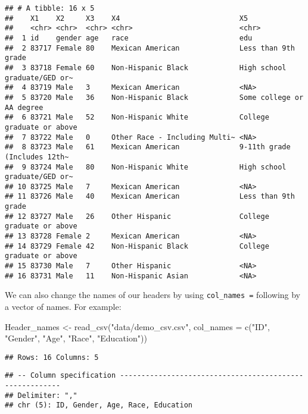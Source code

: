 \documentclass[
]{book}
\newenvironment{Shaded}{\begin{snugshade}}{\end{snugshade}}
\newcommand{\AttributeTok}[1]{\textcolor[rgb]{0.77,0.63,0.00}{#1}}
\newcommand{\FunctionTok}[1]{\textcolor[rgb]{0.00,0.00,0.00}{#1}}
\newcommand{\NormalTok}[1]{#1}
\newcommand{\OtherTok}[1]{\textcolor[rgb]{0.56,0.35,0.01}{#1}}
\newcommand{\StringTok}[1]{\textcolor[rgb]{0.31,0.60,0.02}{#1}}
\begin{document}
\begin{verbatim}
## # A tibble: 16 x 5
##    X1    X2     X3    X4                            X5
##    <chr> <chr>  <chr> <chr>                         <chr>
##  1 id    gender age   race                          edu
##  2 83717 Female 80    Mexican American              Less than 9th grade
##  3 83718 Female 60    Non-Hispanic Black            High school graduate/GED or~
##  4 83719 Male   3     Mexican American              <NA>
##  5 83720 Male   36    Non-Hispanic Black            Some college or AA degree
##  6 83721 Male   52    Non-Hispanic White            College graduate or above
##  7 83722 Male   0     Other Race - Including Multi~ <NA>
##  8 83723 Male   61    Mexican American              9-11th grade (Includes 12th~
##  9 83724 Male   80    Non-Hispanic White            High school graduate/GED or~
## 10 83725 Male   7     Mexican American              <NA>
## 11 83726 Male   40    Mexican American              Less than 9th grade
## 12 83727 Male   26    Other Hispanic                College graduate or above
## 13 83728 Female 2     Mexican American              <NA>
## 14 83729 Female 42    Non-Hispanic Black            College graduate or above
## 15 83730 Male   7     Other Hispanic                <NA>
## 16 83731 Male   11    Non-Hispanic Asian            <NA>
\end{verbatim}

We can also change the names of our headers by using \texttt{col\_names\ =} following by a vector of names. For example:

\begin{Shaded}
\begin{Highlighting}[]
\NormalTok{Header\_names }\OtherTok{\textless{}{-}} \FunctionTok{read\_csv}\NormalTok{(}\StringTok{"data/demo\_csv.csv"}\NormalTok{,}
                      \AttributeTok{col\_names =} \FunctionTok{c}\NormalTok{(}\StringTok{"ID"}\NormalTok{, }\StringTok{"Gender"}\NormalTok{, }\StringTok{"Age"}\NormalTok{, }\StringTok{"Race"}\NormalTok{, }\StringTok{"Education"}\NormalTok{))}
\end{Highlighting}
\end{Shaded}

\begin{verbatim}
## Rows: 16 Columns: 5
\end{verbatim}

\begin{verbatim}
## -- Column specification --------------------------------------------------------
## Delimiter: ","
## chr (5): ID, Gender, Age, Race, Education
\end{verbatim}
\end{document}
